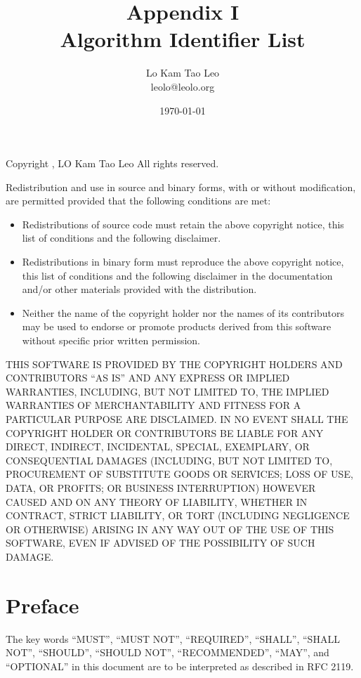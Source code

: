 \documentclass[a4paper,12pt]{article}
\title{Appendix I\\Algorithm Identifier List}
\author{Lo Kam Tao Leo\\leolo@leolo.org}
\date{\today}
\begin{document}
	\maketitle
	\noindent
	Copyright , LO Kam Tao Leo
	All rights reserved.
	
	Redistribution and use in source and binary forms, with or without
	modification, are permitted provided that the following conditions are met:
	\begin{itemize}
		\item Redistributions of source code must retain the above copyright notice, this
		list of conditions and the following disclaimer.
		
		\item Redistributions in binary form must reproduce the above copyright notice,
		this list of conditions and the following disclaimer in the documentation
		and/or other materials provided with the distribution.
		
		\item Neither the name of the copyright holder nor the names of its
		contributors may be used to endorse or promote products derived from
		this software without specific prior written permission.
	\end{itemize}

	
	THIS SOFTWARE IS PROVIDED BY THE COPYRIGHT HOLDERS AND CONTRIBUTORS ``AS IS''
	AND ANY EXPRESS OR IMPLIED WARRANTIES, INCLUDING, BUT NOT LIMITED TO, THE
	IMPLIED WARRANTIES OF MERCHANTABILITY AND FITNESS FOR A PARTICULAR PURPOSE ARE
	DISCLAIMED. IN NO EVENT SHALL THE COPYRIGHT HOLDER OR CONTRIBUTORS BE LIABLE
	FOR ANY DIRECT, INDIRECT, INCIDENTAL, SPECIAL, EXEMPLARY, OR CONSEQUENTIAL
	DAMAGES (INCLUDING, BUT NOT LIMITED TO, PROCUREMENT OF SUBSTITUTE GOODS OR
	SERVICES; LOSS OF USE, DATA, OR PROFITS; OR BUSINESS INTERRUPTION) HOWEVER
	CAUSED AND ON ANY THEORY OF LIABILITY, WHETHER IN CONTRACT, STRICT LIABILITY,
	OR TORT (INCLUDING NEGLIGENCE OR OTHERWISE) ARISING IN ANY WAY OUT OF THE USE
	OF THIS SOFTWARE, EVEN IF ADVISED OF THE POSSIBILITY OF SUCH DAMAGE.
	
	\clearpage
	
	\tableofcontents
	
	\section{Preface}
	The key words ``MUST'', ``MUST NOT'', ``REQUIRED'', ``SHALL'', ``SHALL
	NOT'', ``SHOULD'', ``SHOULD NOT'', ``RECOMMENDED'',  ``MAY'', and
	``OPTIONAL'' in this document are to be interpreted as described in
	RFC 2119.
\end{document}

